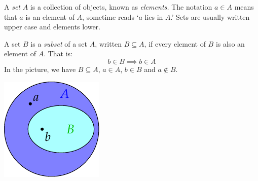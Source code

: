 \begin{defn}{}{}
A \emph{set} $A$ is a collection of objects, known as \emph{elements.}\footnotemark{} The notation $a\in A$ means that $a$ is an element of $A$, sometime reads `$a$ lies in $A$.' Sets are usually written upper case and elements lower.\par
\begin{minipage}[t]{0.75\linewidth}\vspace{0pt}
A set $B$ is a \emph{subset} of a set $A$, written $B\subseteq A$, if every element of $B$ is also an element of $A$. That is:
\[b\in B\implies b\in A\]
In the picture, we have $B\subseteq A$, $a\in A$, $b\in B$ and $a\not\in B$.
\end{minipage}\hfill\begin{minipage}[t]{0.24\linewidth}\vspace{-12pt}
\flushright\includegraphics[scale=0.95]{functions-subset}
\end{minipage}
\end{defn}



